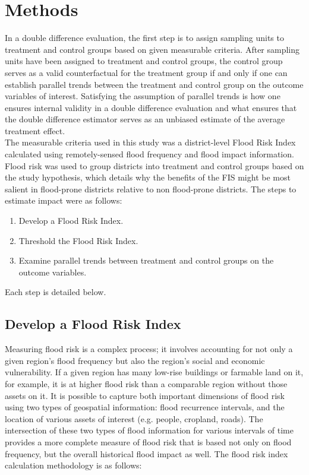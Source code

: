 \chapter{Methods}

In a double difference evaluation, the first step is to assign sampling units to treatment and control groups based on given measurable criteria. After sampling units have been assigned to treatment and control groups, the control group serves as a valid counterfactual for the treatment group if and only if one can establish parallel trends between the treatment and control group on the outcome variables of interest. Satisfying the assumption of parallel trends is how one ensures internal validity in a double difference evaluation and what ensures that the  double difference estimator serves as an unbiased estimate of the average treatment effect.\\

The measurable criteria used in this study was a district-level Flood Risk Index calculated using remotely-sensed flood frequency and flood impact information. Flood risk was used to group districts into treatment and control groups based on the study hypothesis, which details why the benefits of the FIS might be most salient in flood-prone districts relative to non flood-prone districts. The steps to estimate impact were as follows:

\begin{enumerate}
  \item Develop a Flood Risk Index.
  \item Threshold the Flood Risk Index.
  \item Examine parallel trends between treatment and control groups on the outcome variables.
\end{enumerate}

Each step is detailed below.

\section{Develop a Flood Risk Index}

Measuring flood risk is a complex process; it involves accounting for not only a given region’s flood frequency but also the region’s social and economic vulnerability. If a given region has many low-rise buildings or farmable land on it, for example, it is at higher flood risk than a comparable region without those assets on it. It is possible to capture both important dimensions of flood risk using two types of geospatial information: flood recurrence intervals, and the location of various assets of interest (e.g. people, cropland, roads). The intersection of these two types of flood information for various intervals of time provides a more complete measure of flood risk that is based not only on flood frequency, but the overall historical flood impact as well. The flood risk index calculation methodology is as follows:

